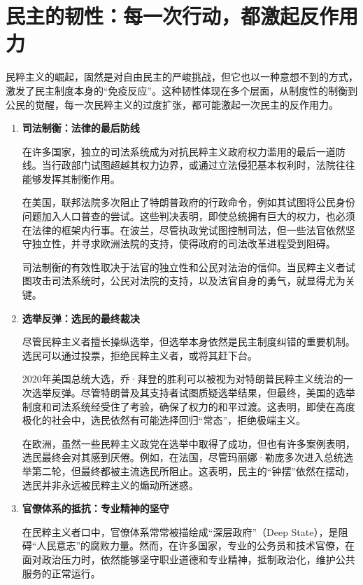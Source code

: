 \section{民主的韧性：每一次行动，都激起反作用力}

民粹主义的崛起，固然是对自由民主的严峻挑战，但它也以一种意想不到的方式，激发了民主制度本身的“免疫反应”。这种韧性体现在多个层面，从制度性的制衡到公民的觉醒，每一次民粹主义的过度扩张，都可能激起一次民主的反作用力。

\begin{enumerate}
    \item \textbf{司法制衡：法律的最后防线}

    在许多国家，独立的司法系统成为对抗民粹主义政府权力滥用的最后一道防线。当行政部门试图超越其权力边界，或通过立法侵犯基本权利时，法院往往能够发挥其制衡作用。

    在美国，联邦法院多次阻止了特朗普政府的行政命令，例如其试图将公民身份问题加入人口普查的尝试。这些判决表明，即使总统拥有巨大的权力，也必须在法律的框架内行事。在波兰，尽管执政党试图控制司法，但一些法官依然坚守独立性，并寻求欧洲法院的支持，使得政府的司法改革进程受到阻碍。

    司法制衡的有效性取决于法官的独立性和公民对法治的信仰。当民粹主义者试图攻击司法系统时，公民对法院的支持，以及法官自身的勇气，就显得尤为关键。

    \item \textbf{选举反弹：选民的最终裁决}

    尽管民粹主义者擅长操纵选举，但选举本身依然是民主制度纠错的重要机制。选民可以通过投票，拒绝民粹主义者，或将其赶下台。

    2020年美国总统大选，乔·拜登的胜利可以被视为对特朗普民粹主义统治的一次选举反弹。尽管特朗普及其支持者试图质疑选举结果，但最终，美国的选举制度和司法系统经受住了考验，确保了权力的和平过渡。这表明，即使在高度极化的社会中，选民依然有可能选择回归“常态”，拒绝极端主义。

    在欧洲，虽然一些民粹主义政党在选举中取得了成功，但也有许多案例表明，选民最终会对其感到厌倦。例如，在法国，尽管玛丽娜·勒庞多次进入总统选举第二轮，但最终都被主流选民所阻止。这表明，民主的“钟摆”依然在摆动，选民并非永远被民粹主义的煽动所迷惑。

    \item \textbf{官僚体系的抵抗：专业精神的坚守}

    在民粹主义者口中，官僚体系常常被描绘成“深层政府”（Deep State），是阻碍“人民意志”的腐败力量。然而，在许多国家，专业的公务员和技术官僚，在面对政治压力时，依然能够坚守职业道德和专业精神，抵制政治化，维护公共服务的正常运行。


\end{enumerate}
